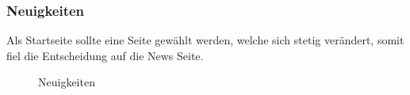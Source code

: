 \newpage
\FloatBarrier
\subsubsection{Neuigkeiten}\label{mockup_news}
Als Startseite sollte eine Seite gewählt werden, welche sich stetig verändert, somit fiel die Entscheidung auf die News Seite.
\begin{figure}[ht]
\centering
{}
\label{fig:mockup_news}
\caption{Neuigkeiten}
\end{figure}

